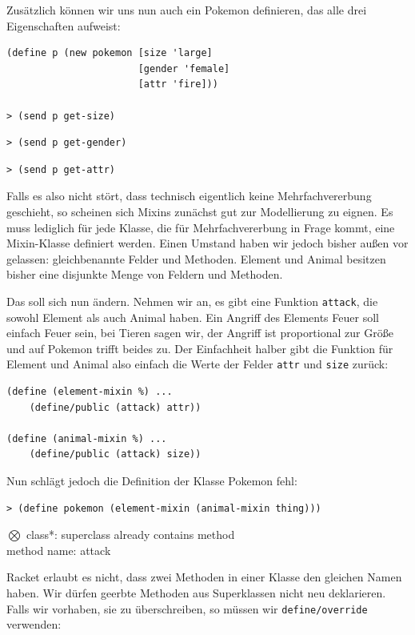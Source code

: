 Zusätzlich können wir uns nun auch ein Pokemon definieren, das alle drei Eigenschaften aufweist:
\begin{lstlisting}
(define p (new pokemon [size 'large]
                       [gender 'female]
                       [attr 'fire]))
 
> (send p get-size)
\end{lstlisting}
{}
\begin{lstlisting}
> (send p get-gender)
\end{lstlisting}
{}
\begin{lstlisting}
> (send p get-attr)
\end{lstlisting}
{}

Falls es also nicht stört, dass technisch eigentlich keine Mehrfachvererbung geschieht, so scheinen sich Mixins zunächst gut zur Modellierung zu eignen. Es muss lediglich für jede Klasse, die für Mehrfachvererbung in Frage kommt, eine Mixin-Klasse definiert werden. Einen Umstand haben wir jedoch bisher außen vor gelassen: gleichbenannte Felder und Methoden. Element und Animal besitzen bisher eine disjunkte Menge von Feldern und Methoden. 

Das soll sich nun ändern. Nehmen wir an, es gibt eine Funktion \texttt{attack}, die sowohl Element als auch Animal haben. Ein Angriff des Elements Feuer soll einfach Feuer sein, bei Tieren sagen wir, der Angriff ist proportional zur Größe und auf Pokemon trifft beides zu. Der Einfachheit halber gibt die Funktion für Element und Animal also einfach die Werte der Felder \texttt{attr} und \texttt{size} zurück:

\begin{lstlisting}
(define (element-mixin %) ...
    (define/public (attack) attr))
 
(define (animal-mixin %) ...
    (define/public (attack) size))
\end{lstlisting}

Nun schlägt jedoch die Definition der Klasse Pokemon fehl:

\begin{lstlisting}
> (define pokemon (element-mixin (animal-mixin thing)))
\end{lstlisting}
{\rerror $\bigotimes$ class*: superclass already contains method\\
method name: attack}

Racket erlaubt es nicht, dass zwei Methoden in einer Klasse den gleichen Namen haben. Wir dürfen geerbte Methoden aus Superklassen nicht neu deklarieren. Falls wir vorhaben, sie zu überschreiben, so müssen wir \texttt{define/override} verwenden:

